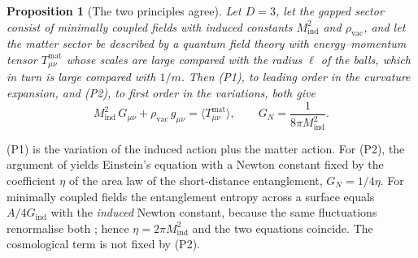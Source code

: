 \documentclass[11pt,a4paper]{article}
\makeatletter
\theoremstyle{stmt}
\newtheorem{proposition}[theorem]{Proposition}
\theoremstyle{defn}
\theoremstyle{rmk}
\renewenvironment{proof}[1][\proofname]{\par\pushQED{\qed}\normalfont\topsep6\p@\@plus6\p@\relax
  \trivlist\item[\hskip\labelsep{\sffamily\itshape\small #1.}]\ignorespaces}{\popQED\endtrivlist\@endpefalse}
\numberwithin{equation}{section}
\makeatother
\begin{document}
\begin{proposition}[The two principles agree]\label{prop:principles}
Let $D=3$, let the gapped sector consist of minimally coupled fields with induced constants $M_{\mathrm{ind}}^2$ and $\rho_{\mathrm{vac}}$, and let the matter sector be described by a quantum field theory with energy--momentum tensor $T^{\mathrm{mat}}_{\mu\nu}$ whose scales are large compared with the radius $\ell$ of the balls, which in turn is large compared with $1/m$. Then (P1), to leading order in the curvature expansion, and (P2), to first order in the variations, both give
\begin{equation}\label{eq:induced}
M_{\mathrm{ind}}^2\,G_{\mu\nu}+\rho_{\mathrm{vac}}\,g_{\mu\nu}=\langle T^{\mathrm{mat}}_{\mu\nu}\rangle ,\qquad G_N=\frac{1}{8\pi M_{\mathrm{ind}}^2}.
\end{equation}
\end{proposition}

\begin{proof}[Justification]
(P1) is the variation of the induced action plus the matter action. For (P2), the argument of \cite{Jacobson16} yields Einstein's equation with a Newton constant fixed by the coefficient $\eta$ of the area law of the short-distance entanglement, $G_N=1/4\eta$. For minimally coupled fields the entanglement entropy across a surface equals $A/4G_{\mathrm{ind}}$ with the \emph{induced} Newton constant, because the same fluctuations renormalise both \cite{Jacobson94,Solodukhin}; hence $\eta=2\pi M_{\mathrm{ind}}^2$ and the two equations coincide. The cosmological term is not fixed by (P2).
\end{proof}
\end{document}

